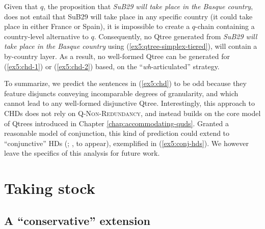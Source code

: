 Given that $q$, the proposition that \textit{SuB29 will take place in the Basque country}, does not entail that SuB29 will take place in any specific country (it could take place in either France or Spain), it is impossible to create a $q$-chain containing a country-level alternative to $q$. Consequently, no Qtree generated from \textit{SuB29 will take place in the Basque country} using (\ref{ex5:qtree-simplex-tiered}), will contain a by-country layer. As a result, no well-formed Qtree can be generated for (\ref{ex5:chd-1}) or (\ref{ex5:chd-2}) based, on the ``\textit{wh}-articulated'' strategy.


To summarize, we predict the sentences in (\ref{ex5:chd}) to be odd because they feature disjuncts conveying incomparable degrees of granularity, and which cannot lead to any well-formed disjunctive Qtree. Interestingly, this approach to CHDs does not rely on \textsc{Q-Non-Redundancy}, and instead builds on the core model of Qtrees introduced in Chapter \ref{chap:accommodating-quds}. Granted a reasonable model of conjunction, this kind of prediction could extend to ``conjunctive'' HDs (; \citeauthor{Zhang2024}, to appear), exemplified in (\ref{ex5:conj-hds}). We however leave the specifics of this analysis for future work.


\begin{exe}
	\ex \label{ex5:conj-hds}
	\begin{xlist}
	\end{xlist}
\end{exe}


\section{Taking stock}\label{sec5:discussion}
\subsection{A ``conservative'' extension}\label{sec5:extension}

